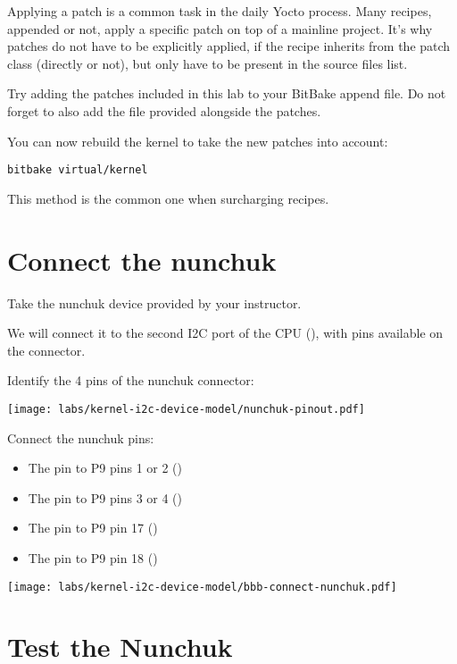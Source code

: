 Applying a patch is a common task in the daily Yocto process. Many recipes,
appended or not, apply a specific patch on top of a mainline project. It's why
patches do not have to be explicitly applied, if the recipe inherits from the
patch class (directly or not), but only have to be present in the source files
list.

Try adding the patches included in this lab to your BitBake append
file. Do not forget to also add the  file provided
alongside the patches.

You can now rebuild the  kernel to take the new
patches into account:
\begin{verbatim}
bitbake virtual/kernel
\end{verbatim}

This method is the common one when surcharging recipes.

\section{Connect the nunchuk}

Take the nunchuk device provided by your instructor.

We will connect it to the second I2C port of the CPU (),
with pins available on the  connector.

Identify the 4 pins of the nunchuk connector:

\begin{center}
\texttt{[image: labs/kernel-i2c-device-model/nunchuk-pinout.pdf]}
\end{center}

Connect the nunchuk pins:
\begin{itemize}
\item The  pin to P9 pins 1 or 2 ()
\item The  pin to P9 pins 3 or 4 ()
\item The  pin to P9 pin 17 ()
\item The  pin to P9 pin 18 ()
\end{itemize}

\begin{center}
\texttt{[image: labs/kernel-i2c-device-model/bbb-connect-nunchuk.pdf]}
\end{center}

\section{Test the Nunchuk}

